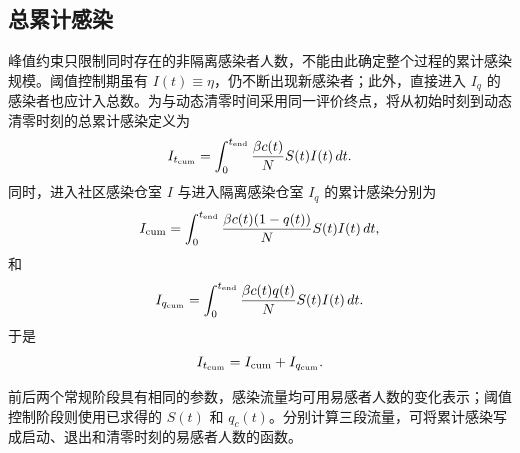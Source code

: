 \documentclass[lang=cn,a4paper,newtx]{elegantpaper}
\numberwithin{equation}{section}
\theoremstyle{plain}
\newcommand{\Itcum}{I_{t_{\mathrm{cum}}}}
\begin{document}
\subsection{总累计感染}
峰值约束只限制同时存在的非隔离感染者人数，不能由此确定整个过程的累计感染规模。阈值控制期虽有 $I(t)\equiv\eta$，仍不断出现新感染者；此外，直接进入 $I_q$ 的感染者也应计入总数。为与动态清零时间采用同一评价终点，将从初始时刻到动态清零时刻的总累计感染定义为
\begin{equation}
\Itcum
=
\int_0^{t_{\rm end}}\frac{\beta c(t)}{N}S(t)I(t)\,dt.
\end{equation}
同时，进入社区感染仓室 $I$ 与进入隔离感染仓室 $I_q$ 的累计感染分别为
\begin{equation}
I_{\rm cum}
=
\int_0^{t_{\rm end}}
\frac{\beta c(t)(1-q(t))}{N}S(t)I(t)\,dt,
\end{equation}
和
\begin{equation}
I_{q_{\rm cum}}
=
\int_0^{t_{\rm end}}
\frac{\beta c(t)q(t)}{N}S(t)I(t)\,dt.
\end{equation}
于是
\[
\Itcum=I_{\rm cum}+I_{q_{\rm cum}}.
\]

前后两个常规阶段具有相同的参数，感染流量均可用易感者人数的变化表示；阈值控制阶段则使用已求得的 $S(t)$ 和 $q_c(t)$。分别计算三段流量，可将累计感染写成启动、退出和清零时刻的易感者人数的函数。
\end{document}
